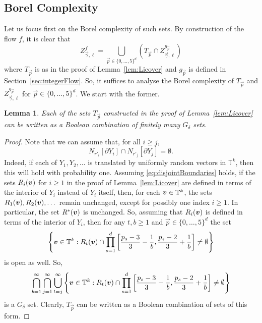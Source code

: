 \documentclass[12pt,a4paper]{amsart}
\numberwithin{equation}{section}
\newtheorem{lemma}[equation]{Lemma}
\theoremstyle{definition}
\begin{document}
\subsection{Borel Complexity}

Let us focus first on the Borel complexity of such sets. By construction of the flow $f$, it is clear that
\begin{equation}\label{eq:Zunionp}Z_{\vec{\gamma},\ell}^f = \bigcup_{\vec{p}\in\{0,\dots,5\}^d}\left(T_{\vec{p}}\cap Z^{g_{\vec{p}}}_{\vec{\gamma},\ell}\right)\end{equation}
where $T_{\vec{p}}$ is as in the proof of Lemma~\ref{lem:Licover} and $g_{\vec{p}}$ is defined in Section~\ref{sec:integerFlow}. So, it suffices to analyse the Borel complexity of $T_{\vec{p}}$ and $Z^{g_{\vec{p}}}_{\vec{\gamma},\ell}$ for $\vec{p}\in \{0,\dots,5\}^d$. We start with the former. 



\begin{lemma}
\label{lem:TpHierarchy}
Each of the sets $T_{\vec{p}}$ constructed in the proof of Lemma~\ref{lem:Licover} can be written as a Boolean combination of finitely many $G_\delta$ sets.
\end{lemma}

\begin{proof}
Note that we can assume that, for all $i\geq j$, 
\begin{equation}\label{eq:disjointBoundaries}N_{r'_i}[\partial Y_i]\cap N_{r'_j}[\partial Y_j]=\emptyset.\end{equation}
Indeed, if each of $Y_1,Y_2,\dots$ is translated by uniformly random vectors in $\mathbb{T}^k$, then this will hold with probability one. Assuming \eqref{eq:disjointBoundaries} holds, if the sets $R_i(\boldsymbol{v})$ for $i\geq1$ in the proof of Lemma~\ref{lem:Licover} are defined in terms of the interior of $Y_i$ instead of $Y_i$ itself, then, for each $\boldsymbol{v}\in \mathbb{T}^k$, the sets $R_1(\boldsymbol{v}),R_2(\boldsymbol{v}),\dots$ remain unchanged, except for possibly one index $i\geq1$. In particular, the set $R^*(\boldsymbol{v})$ is unchanged. So, assuming that $R_i(\boldsymbol{v})$ is defined in terms of the interior of $Y_i$, then for any $t,b\geq1$ and $\vec{p}\in\{0,\dots,5\}^d$ the set
\[\left\{\boldsymbol{v}\in\mathbb{T}^k: R_t(\boldsymbol{v})\cap \prod_{s=1}^d\left[\frac{p_s-3}{3}-\frac{1}{b},\frac{p_s-2}{3}+\frac{1}{b}\right]\neq\emptyset\right\}\]
is open as well. So,  
\[\bigcap_{b=1}^\infty\bigcap_{j=1}^\infty\bigcup_{t=j}^\infty\left\{\boldsymbol{v}\in\mathbb{T}^k: R_t(\boldsymbol{v})\cap \prod_{s=1}^d\left[\frac{p_s-3}{3}-\frac{1}{b},\frac{p_s-2}{3}+\frac{1}{b}\right]\neq\emptyset\right\}\]
is a $G_\delta$ set. Clearly, $T_{\vec{p}}$ can be written as a Boolean combination of sets of this form.
\end{proof}
\end{document}
